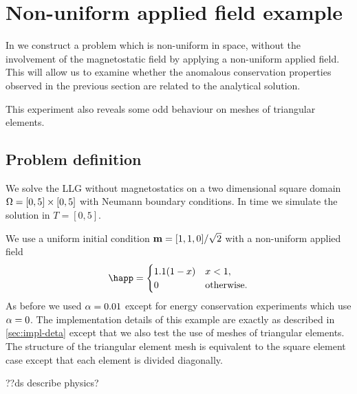 \FloatBarrier
\section{Non-uniform applied field example}
\label{sec:non-uniform-applied}

In  we construct a problem which is non-uniform in space, without the involvement of the magnetostatic field by applying a non-uniform applied field.
This will allow us to examine whether the anomalous conservation properties observed in the previous section are related to the analytical solution.

This experiment also reveals some odd behaviour on meshes of triangular elements.

\subsection{Problem definition}

We solve the LLG without magnetostatics on a two dimensional square domain $\Omega = [0,5] \times [0,5]$ with Neumann boundary conditions.
In time we simulate the solution in $T = [0, 5]$.

We use a uniform initial condition $\boldsymbol{\mathrm{m}} = [1, 1, 0]/\sqrt{2}$ with a non-uniform applied field
\begin{equation}
  \happ =
  \begin{cases}
    1.1 (1 -  x) & x  < 1, \\
    0 & \mathrm{otherwise}.
  \end{cases}
\end{equation}
As before we used $\alpha = 0.01$ except for energy conservation experiments which use $\alpha = 0$.
The implementation details of this example are exactly as described in \cref{sec:impl-deta} except that we also test the use of meshes of triangular elements.
The structure of the triangular element mesh is equivalent to the square element case except that each element is divided diagonally.

??ds describe physics?





